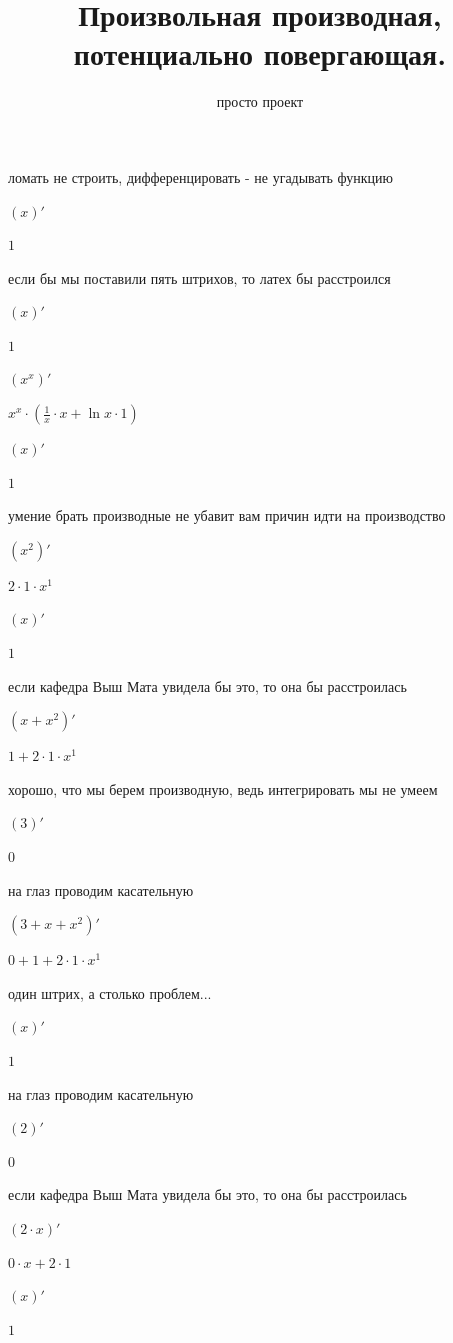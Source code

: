 \documentclass[a4paper,12pt]{article}
\title{Произвольная производная, потенциально повергающая.}
\author{просто проект}
\begin{document}
\maketitle

ломать не строить, дифференцировать - не угадывать функцию 

$(x)'$

$1$

если бы мы поставили пять штрихов, то латех бы расстроился 

$(x)'$

$1$

  

$(x^{x})'$

$x^{x} \cdot ( \frac{1}{x}  \cdot x+ \ln x \cdot 1)$

  

$(x)'$

$1$

умение брать производные не убавит вам причин идти на производство 

$(x^{2})'$

$2 \cdot 1 \cdot x^{1}$

  

$(x)'$

$1$

если кафедра Выш Мата увидела бы это, то она бы расстроилась 

$(x+x^{2})'$

$1+2 \cdot 1 \cdot x^{1}$

хорошо, что мы берем производную, ведь интегрировать мы не умеем 

$(3)'$

$0$

на глаз проводим касательную 

$(3+x+x^{2})'$

$0+1+2 \cdot 1 \cdot x^{1}$

один штрих, а столько проблем... 

$(x)'$

$1$

на глаз проводим касательную 

$(2)'$

$0$

если кафедра Выш Мата увидела бы это, то она бы расстроилась 

$(2 \cdot x)'$

$0 \cdot x+2 \cdot 1$

  

$(x)'$

$1$
\end{document}
